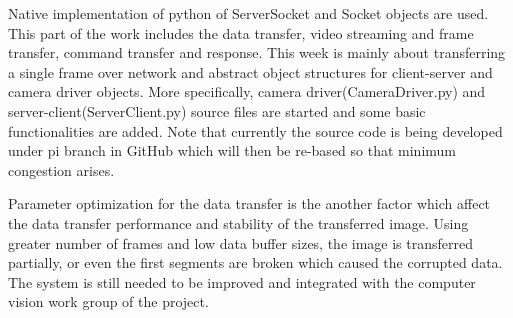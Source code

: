 Native implementation of python of ServerSocket and Socket objects are used\cite{cite:pythonSocket}. This part of the work includes the data transfer, video streaming and frame transfer, command transfer and response. This week is mainly about transferring a single frame over network and abstract object structures for client-server and camera driver objects. More specifically, camera driver(CameraDriver.py) and server-client(ServerClient.py) source files are started and some basic functionalities are added\cite{cite:picamera}. Note that currently the source code is being developed under pi branch in GitHub which will then be re-based so that minimum congestion arises.

Parameter optimization for the data transfer is the another factor which affect the data transfer performance and stability of the transferred image. Using greater number of frames and low data buffer sizes, the image is transferred partially, or even the first segments are broken which caused the corrupted data. The system is still needed to be improved and integrated with the computer vision work group of the project.